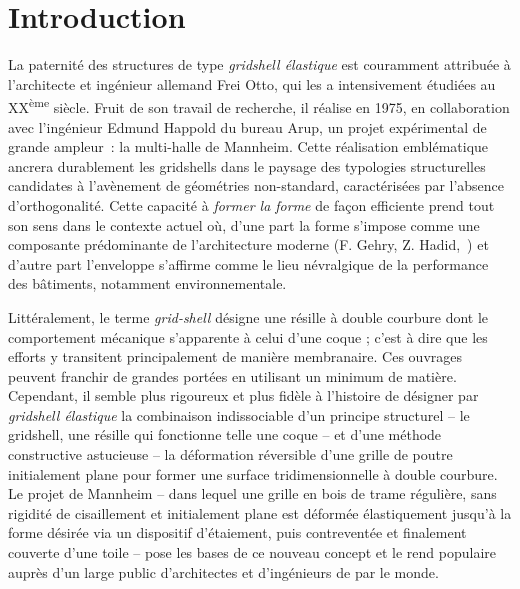 




\chapter{Introduction}\label{chp:intro}

La paternité des structures de type \emph{gridshell élastique} est couramment attribuée à l'architecte et ingénieur allemand Frei Otto, qui les a intensivement étudiées au XX\textsuperscript{ème} siècle. Fruit de son travail de recherche, il réalise en 1975, en collaboration avec l'ingénieur Edmund Happold du bureau Arup, un projet expérimental de grande ampleur~: la multi-halle de Mannheim. Cette réalisation emblématique ancrera durablement les gridshells dans le paysage des typologies structurelles candidates à l'avènement de géométries non-standard, caractérisées par l'absence d'orthogonalité. Cette capacité à \emph{former la forme} de façon efficiente prend tout son sens dans le contexte actuel où, d'une part la forme s'impose comme une composante prédominante de l'architecture moderne (F. Gehry, Z. Hadid,~\telp{}) et d'autre part l'enveloppe s'affirme comme le lieu névralgique de la performance des bâtiments, notamment environnementale.

Littéralement, le terme \emph{grid-shell} désigne une résille à double courbure dont le comportement mécanique s'apparente à celui d'une coque ; c'est à dire que les efforts y transitent principalement de manière membranaire. Ces ouvrages peuvent franchir de grandes portées en utilisant un minimum de matière. Cependant, il semble plus rigoureux et plus fidèle à l'histoire de désigner par \emph{gridshell élastique} la combinaison indissociable d'un principe structurel -- le gridshell, une résille qui fonctionne telle une coque -- et d'une méthode constructive astucieuse -- la déformation réversible d'une grille de poutre initialement plane pour former une surface tridimensionnelle à double courbure. Le projet de Mannheim -- dans lequel une grille en bois de trame régulière, sans rigidité de cisaillement et initialement plane est déformée élastiquement jusqu'à la forme désirée via un dispositif d'étaiement, puis contreventée et finalement couverte d'une toile -- pose les bases de ce nouveau concept et le rend populaire auprès d'un large public d'architectes et d'ingénieurs de par le monde.

